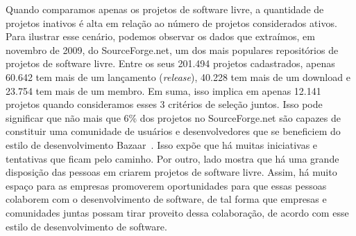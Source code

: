 Quando comparamos apenas os projetos de software livre, a quantidade de projetos inativos
é alta em relação ao número de projetos considerados ativos.
%
Para ilustrar esse cenário, podemos observar os dados que extraímos, em novembro de 2009, do 
SourceForge.net, um dos mais populares repositórios de projetos de software livre.
Entre os seus 201.494 projetos cadastrados, apenas 60.642
tem mais de um lançamento (\textit{release}), 40.228 tem mais de um download e 23.754 tem
mais de um membro.
%
Em suma, isso implica em apenas 12.141 projetos quando consideramos esses 3
critérios de seleção juntos. Isso pode significar que não mais que 6\% dos
projetos no SourceForge.net são capazes de constituir uma comunidade de usuários
e desenvolvedores que se beneficiem do estilo de desenvolvimento
Bazaar~\cite{CATHEDRAL}.
%
Isso expõe que há muitas iniciativas e tentativas que ficam pelo caminho. Por outro,
lado mostra que há uma grande disposição das pessoas em criarem projetos de software
livre. Assim, há muito espaço para as empresas promoverem oportunidades para que
essas pessoas colaborem com o desenvolvimento de software, de tal forma que
empresas e comunidades juntas possam tirar proveito dessa colaboração, de
acordo com esse estilo de desenvolvimento de software.

\begin{comment}
    \begin{itemize}

    \item As questões éticas são importantes para a comunidade.

    \item As questões técnicas \emph{também} são importantes para a
    comunidade.

    \item Software Livre X software gratuito: o impacto do Java,
    Flash, Qt, drivers nVidia\ldots{}

    \item metodologias de desenvolvimento com a comunidade.

    \item ferramentas: svn, git, bazaar, mercurial.

    \end{itemize}
\end{comment}
